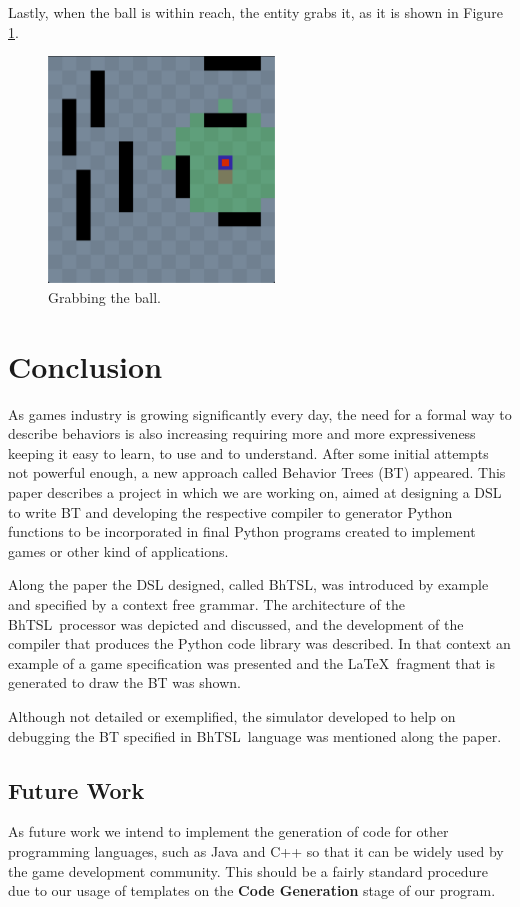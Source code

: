 \documentclass[a4paper,UKenglish,cleveref, autoref, thm-restate]{oasics-v2019}
\def\bht{BhTSL}
\begin{document}
Lastly, when the ball is within reach, the entity grabs it, as it is shown in Figure \ref{fig:grabbing}.

\begin{figure}
    \centering
    \includegraphics[width=6cm]{Grabbing.png}
    \caption{Grabbing the ball.}
    \label{fig:grabbing}
\end{figure}


\section{Conclusion}
\label{sec:conclusion}

As games industry is growing significantly every day, the need for a formal way to describe behaviors
is also increasing requiring more and more expressiveness keeping it easy to learn, to use and to understand.
After some initial attempts not powerful enough, a new approach called Behavior Trees (BT) appeared.
This paper describes a project in which we are working on, aimed at designing a DSL to write BT
and developing the respective compiler to generator Python functions to be incorporated in final Python
programs created to implement games or other kind of applications.

Along the paper the DSL designed, called \bht, was introduced by example and specified by a context
free grammar.
The architecture of the \bht\ processor was depicted and discussed, and the development of the compiler that produces the
Python code library  was described.
In that context an example of a game  specification was presented and the \LaTeX\ fragment that is
 generated to draw the BT was shown.

Although not detailed or exemplified, the simulator developed to help on debugging the BT specified in
\bht\ language was mentioned along the paper.

\subsection{Future Work}
As future work we intend to implement the generation of code for other programming languages, such as Java and C++ so that it can be widely used by the game development community.
This should be a fairly standard procedure due to our usage of templates on the \textbf{Code Generation} stage of our program.
\end{document}
